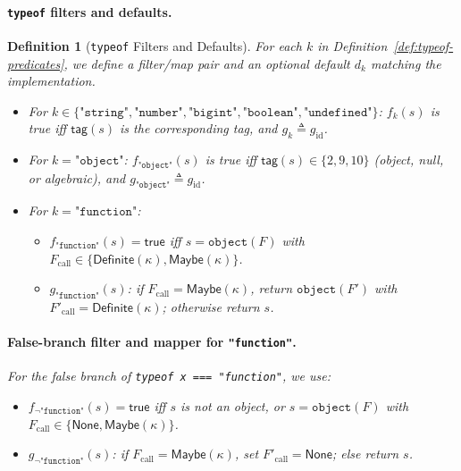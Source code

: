 \documentclass[11pt]{article}
\newtheorem{definition}[theorem]{Definition}
\newcommand{\tagfn}{\mathsf{tag}}
\begin{document}
\paragraph{\texttt{typeof} filters and defaults.}
\begin{definition}[\texttt{typeof} Filters and Defaults]
\label{def:typeof-filters-defaults}
For each $k$ in Definition~\ref{def:typeof-predicates}, we define a filter/map pair and an optional default $d_k$ matching the implementation.
\begin{itemize}
\item For $k \in \{\texttt{"string"},\texttt{"number"},\texttt{"bigint"},\texttt{"boolean"},\texttt{"undefined"}\}$:
  $f_k(s)$ is true iff $\tagfn(s)$ is the corresponding tag, and $g_k \triangleq g_{\mathrm{id}}$.

\item For $k=\texttt{"object"}$:
  $f_{\texttt{"object"}}(s)$ is true iff $\tagfn(s)\in\{2,9,10\}$ (object, null, or algebraic), and $g_{\texttt{"object"}} \triangleq g_{\mathrm{id}}$.

\item For $k=\texttt{"function"}$:
  \begin{itemize}
  \item $f_{\texttt{"function"}}(s) = \mathsf{true}$ iff $s=\texttt{object}(F)$ with $F_{\mathrm{call}} \in \{\mathsf{Definite}(\kappa), \mathsf{Maybe}(\kappa)\}$.
  \item $g_{\texttt{"function"}}(s)$: if $F_{\mathrm{call}} = \mathsf{Maybe}(\kappa)$, return $\texttt{object}(F')$ with $F'_{\mathrm{call}} = \mathsf{Definite}(\kappa)$; otherwise return $s$.
  \end{itemize}
\end{itemize}
\paragraph{False-branch filter and mapper for \texttt{"function"}.}
For the false branch of \texttt{typeof x === "function"}, we use:
\begin{itemize}
\item $f_{\neg\texttt{"function"}}(s) = \mathsf{true}$ iff $s$ is not an object, or $s=\texttt{object}(F)$ with $F_{\mathrm{call}} \in \{\mathsf{None}, \mathsf{Maybe}(\kappa)\}$.
\item $g_{\neg\texttt{"function"}}(s)$: if $F_{\mathrm{call}} = \mathsf{Maybe}(\kappa)$, set $F'_{\mathrm{call}} = \mathsf{None}$; else return $s$.
\end{itemize}

\end{definition}
\end{document}
